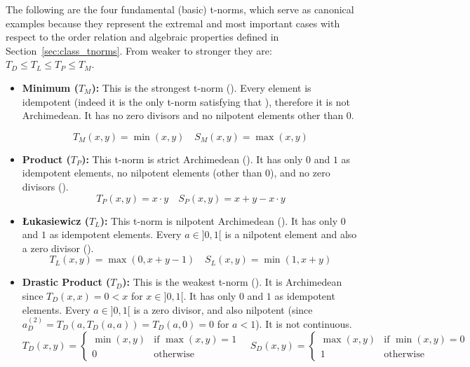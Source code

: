   \begin{example}\label{ex:basic_tnorms}
    The following are the four fundamental (basic) t-norms, which serve as canonical examples because they represent the extremal and most important cases with respect to the order relation and algebraic properties defined in Section~\ref{sec:class_tnorms}. From weaker to stronger they are: $T_D \leq T_L \leq T_P \leq T_M$.
      \begin{itemize}
        \item \textbf{Minimum ($T_M$):} 
            This is the strongest t-norm (\cite[Rem.~1.5(i)]{Klement2000}). Every element is idempotent (indeed it is the only t-norm satisfying that \cite[Lem.~1.2.3]{FULLER2}), therefore it is not Archimedean. It has no zero divisors and no nilpotent elements other than 0.
    
        \[T_M(x, y) = \min(x, y) \quad S_M(x, y) = \max(x, y)
    \]
        \item \textbf{Product ($T_P$):} 
        This t-norm is strict Archimedean (\cite[Ex.~2.14(i)]{Klement2000}). It has only $0$ and $1$ as idempotent elements, no nilpotent elements (other than $0$), and no zero divisors (\cite[Ex.~2.2(i)]{Klement2000}).
        \[T_P(x, y) = x \cdot y \quad S_P(x, y) = x + y - x \cdot y\]
        \item \textbf{Łukasiewicz ($T_L$):} 
        This t-norm is nilpotent Archimedean (\cite[Ex.~2.14(i)]{Klement2000}). It has only $0$ and $1$ as idempotent elements. Every $a \in ]0,1[$ is a nilpotent element and also a zero divisor (\cite[Ex.~2.2(i)]{Klement2000}).
        \[T_L(x, y) = \max(0, x + y - 1) \quad S_L(x, y) = \min(1, x + y)\]
        \item \textbf{Drastic Product ($T_D$):} This is the weakest t-norm (\cite[Rem.~1.5(i)]{Klement2000}). It is Archimedean since $T_D(x,x)=0 < x$ for $x \in ]0,1[$. It has only $0$ and $1$ as idempotent elements. Every $a \in ]0,1[$ is a zero divisor, and also nilpotent (since $a_D^{(2)} = T_D(a, T_D(a,a)) = T_D(a,0) = 0$ for $a<1$). It is not continuous.
        \[T_D(x, y) = \begin{cases} \min(x,y) & \text{if } \max(x,y)=1 \\ 0 & \text{otherwise} \end{cases} \quad S_D(x, y) = \begin{cases} \max(x,y) & \text{if } \min(x,y)=0 \\ 1 & \text{otherwise} \end{cases}\]
      \end{itemize}
    \end{example}

